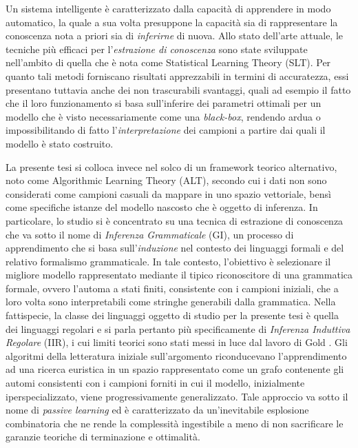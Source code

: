 \label{cap:sommario}
Un sistema intelligente è caratterizzato dalla capacità di apprendere in modo automatico, la quale a sua volta presuppone la capacità sia di rappresentare la conoscenza nota a priori sia di \textit{inferirne} di nuova. Allo stato dell'arte attuale, le tecniche più efficaci per l'\textit{estrazione di conoscenza} sono state sviluppate nell'ambito di quella che è nota come Statistical Learning Theory (SLT). Per quanto tali metodi forniscano risultati apprezzabili in termini di accuratezza, essi presentano tuttavia anche dei non trascurabili svantaggi, quali ad esempio il fatto che il loro funzionamento si basa sull'inferire dei parametri ottimali per un modello che è visto necessariamente come una \textit{black-box}, rendendo ardua o impossibilitando di fatto l'\textit{interpretazione} dei campioni a partire dai quali il modello è stato costruito.

La presente tesi si colloca invece nel solco di un framework teorico alternativo, noto come Algorithmic Learning Theory (ALT), secondo cui i dati non sono considerati come campioni casuali da mappare in uno spazio vettoriale, bensì come specifiche istanze del modello nascosto che è oggetto di inferenza. In particolare, lo studio si è concentrato su una tecnica di estrazione di conoscenza che va sotto il nome di \textit{Inferenza Grammaticale} (GI), un processo di apprendimento che si basa sull'\textit{induzione} nel contesto dei linguaggi formali e del relativo formalismo grammaticale. In tale contesto, l'obiettivo è selezionare il migliore modello rappresentato mediante il tipico riconoscitore di una grammatica formale, ovvero l'automa a stati finiti, consistente con i campioni iniziali, che a loro volta sono interpretabili come stringhe generabili dalla grammatica. Nella fattispecie, la classe dei linguaggi oggetto di studio per la presente tesi è quella dei linguaggi regolari e si parla pertanto più specificamente di \textit{Inferenza Induttiva Regolare} (IIR), i cui limiti teorici sono stati messi in luce dal lavoro di Gold \cite{Gold67}. Gli algoritmi della letteratura iniziale sull'argomento riconducevano l'apprendimento ad una ricerca euristica in un spazio rappresentato come un grafo contenente gli automi consistenti con i campioni forniti in cui il modello, inizialmente iperspecializzato, viene progressivamente generalizzato. Tale approccio va sotto il nome di \textit{passive learning} ed è caratterizzato da un'inevitabile esplosione combinatoria che ne rende la complessità ingestibile a meno di non sacrificare le garanzie teoriche di terminazione e ottimalità.


